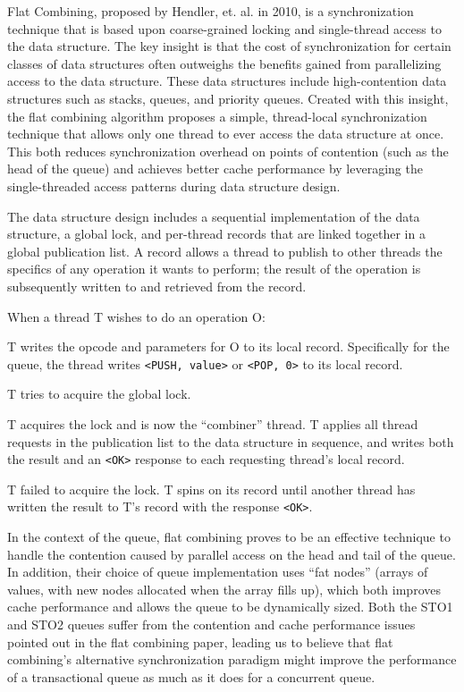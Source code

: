 Flat Combining, proposed by Hendler, et. al. in 2010, is a synchronization technique that is based upon coarse-grained locking and single-thread access to the data structure. The key insight is that the cost of synchronization for certain classes of data structures often outweighs the benefits gained from parallelizing access to the data structure. These data structures include high-contention data structures such as stacks, queues, and priority queues. Created with this insight, the flat combining algorithm proposes a simple, thread-local synchronization technique that allows only one thread to ever access the data structure at once. This both reduces synchronization overhead on points of contention (such as the head of the queue) and achieves better cache performance by leveraging the single-threaded access patterns during data structure design.

The data structure design includes a sequential implementation of the data structure, a global lock, and per-thread records that are linked together in a global publication list. A record allows a thread to publish to other threads the specifics of any operation it wants to perform; the result of the operation is subsequently written to and retrieved from the record.

When a thread T wishes to do an operation O:
\begin{ordlist}
    \item T writes the opcode and parameters for O to its local record. Specifically for the queue, the thread writes \texttt{<PUSH, value>} or \texttt{<POP, 0>} to its local record.
   \item T tries to acquire the global lock.
   \begin{ordlist}
        \item T acquires the lock and is now the “combiner” thread. T applies all thread requests in the publication list to the data structure in sequence, and writes both the result and an \texttt{<OK>} response to each requesting thread’s local record.
        \item T failed to acquire the lock. T spins on its record until another thread has written the result to T’s record with the response \texttt{<OK>}.
    \end{ordlist}
\end{ordlist}

In the context of the queue, flat combining proves to be an effective technique to handle the contention caused by parallel access on the head and tail of the queue. In addition, their choice of queue implementation uses “fat nodes” (arrays of values, with new nodes allocated when the array fills up), which both improves cache performance and allows the queue to be dynamically sized. Both the STO1 and STO2 queues suffer from the contention and cache performance issues pointed out in the flat combining paper, leading us to believe that flat combining’s alternative synchronization paradigm might improve the performance of a transactional queue as much as it does for a concurrent queue.

